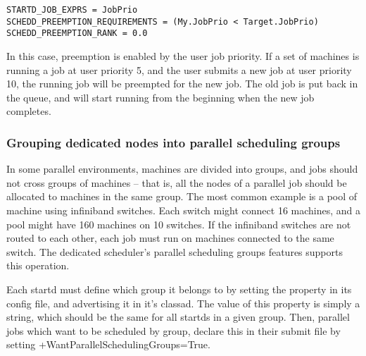 \begin{verbatim}
STARTD_JOB_EXPRS = JobPrio
SCHEDD_PREEMPTION_REQUIREMENTS = (My.JobPrio < Target.JobPrio)
SCHEDD_PREEMPTION_RANK = 0.0
\end{verbatim}

In this case, preemption is enabled by the user job priority. If a set
of machines is running a job at user priority 5, and the user submits
a new job at user priority 10, the running job will be preempted for
the new job.  The old job is put back in the queue, and will start running
from the beginning when the new job completes.

\subsubsection{\label{sec:Configure-Dedicated-Groups}
Grouping dedicated nodes into parallel scheduling groups}

In some parallel environments, machines are divided into groups, and
jobs should not cross groups of machines -- that is, all the nodes of a parallel
job should be allocated to machines in the same group.  The most common
example is a pool of machine using infiniband switches.  Each switch
might connect 16 machines, and a pool might have 160 machines on 10 switches.
If the infiniband switches are not routed to each other, each job must run 
on machines connected to the same switch.  The dedicated scheduler's 
parallel scheduling groups features supports this operation.

Each startd must define which group it belongs to by setting the 
 property in its config file, and 
advertising it in it's classad.  The value of this property is simply a
string, which should be the same for all startds in a given group.  Then,
parallel jobs which want to be scheduled by group, declare this in their 
submit file by setting +WantParallelSchedulingGroups=True.

